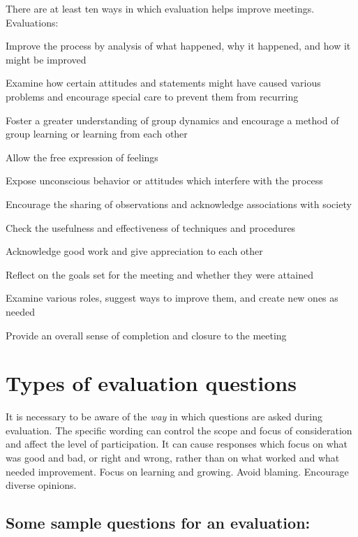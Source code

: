 There are at least ten ways in which evaluation helps improve meetings. Evaluations:

\squishitemize%
\item Improve the process by analysis of what happened, why it
happened, and how it might be improved
\item Examine how certain attitudes and statements might have
  caused various problems and encourage special care to prevent
  them from recurring
\item Foster a greater understanding of group dynamics and encourage a method of group learning or learning from each other
\item Allow the free expression of feelings
\item Expose unconscious behavior or attitudes which interfere
  with the process
\item Encourage the sharing of observations and acknowledge
  associations with society
\item Check the usefulness and effectiveness of techniques and
  procedures
\item Acknowledge good work and give appreciation to each other
\item Reflect on the goals set for the meeting and whether they
  were attained
\item Examine various roles, suggest ways to improve them, and
  create new ones as needed
\item Provide an overall sense of completion and closure to the
  meeting
\squishend%

\section{Types of evaluation questions}

It is necessary to be aware of the \emph{way} in which questions
are asked during evaluation. The specific wording can control the
scope and focus of consideration and affect the level of
participation. It can cause responses which focus on what was good
and bad, or right and wrong, rather than on what worked and what
needed improvement. Focus on learning and growing. Avoid
blaming. Encourage diverse opinions.

\subsection*{Some sample questions for an evaluation:}




